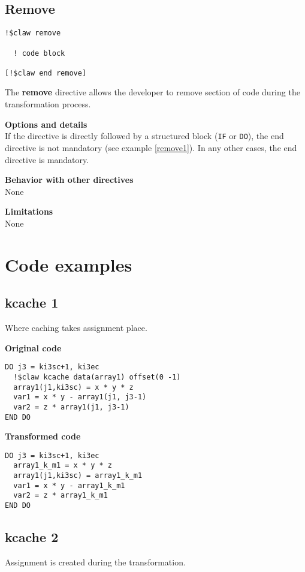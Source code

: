 \documentclass{article}
\begin{document}
\subsection{Remove}
\begin{lstlisting}
!$claw remove

  ! code block
  
[!$claw end remove]
\end{lstlisting}

The \textbf{remove} directive allows the developer to remove section of code
during the transformation process. 

\textbf{Options and details}\\
If the directive is directly followed by a structured block (\lstinline!IF! or \lstinline!DO!), the
end directive is not mandatory (see example \ref{remove1}). In any other cases, the end
directive is mandatory.

\textbf{Behavior with other directives}\\
None

\textbf{Limitations}\\
None


\appendix

\section{Code examples}

\subsection{kcache 1}
\label{kcache1}
Where caching takes assignment place. 

\textbf{Original code}
\begin{lstlisting}
DO j3 = ki3sc+1, ki3ec
  !$claw kcache data(array1) offset(0 -1)
  array1(j1,ki3sc) = x * y * z
  var1 = x * y - array1(j1, j3-1)
  var2 = z * array1(j1, j3-1)
END DO
\end{lstlisting}


\textbf{Transformed code}
\begin{lstlisting}
DO j3 = ki3sc+1, ki3ec
  array1_k_m1 = x * y * z
  array1(j1,ki3sc) = array1_k_m1
  var1 = x * y - array1_k_m1
  var2 = z * array1_k_m1
END DO
\end{lstlisting}


\subsection{kcache 2}
\label{kcache2}
Assignment is created during the transformation. 
\end{document}
